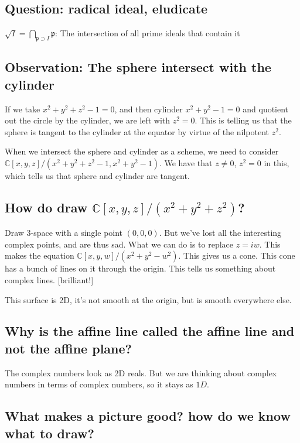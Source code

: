 \documentclass{book}
\newcommand{\C}{\ensuremath{\mathbb{C}}}
\newcommand{\p}{\mathfrak{p}}
\theoremstyle{definition}
\begin{document}
\subsection{Question: radical ideal, eludicate}
$\sqrt{I} = \bigcap_{\p \supset I} \p$: The intersection of all prime ideals
that contain it

\subsection{Observation: The sphere intersect with the cylinder}

If we take $x^2 + y^2 + z^2 - 1 = 0$, and then cylinder $x^2 + y^2 - 1 = 0$
and quotient out the circle by the cylinder, we are left with $z^2 = 0$.
This is telling us that the sphere is tangent to the cylinder at the equator
by virtue of the nilpotent $z^2$. 

When we intersect the sphere and cylinder as a scheme, we need to consider
$\C[x, y, z] / (x^2 + y^2 + z^2 - 1, x^2 + y^2 - 1)$. We have that $z \neq 0$, $z^2 = 0$
in this, which tells us that sphere and cylinder are tangent.

\subsection{How do draw $\C[x, y, z] / (x^2 + y^2 + z^2)$?}

Draw 3-space with a single point $(0, 0, 0)$. But we've lost all the interesting
complex points, and are thus sad.  What we can do is to replace $z = iw$. This
makes the equation $\C[x, y, w] / (x^2 + y^2 - w^2)$. This gives us a cone.
This cone has a bunch of lines on it through the origin.  This tells us
something about complex lines.  [brilliant!]

This surface is 2D, it's not smooth at the origin, but is smooth everywhere else.

\subsection{Why is the affine line called the affine line and not the affine plane?}

The complex numbers look as 2D reals. But we are thinking about complex numbers
in terms of complex numbers, so it stays as $1D$.

\subsection{What makes a picture good? how do we know what to draw?}
\end{document}
